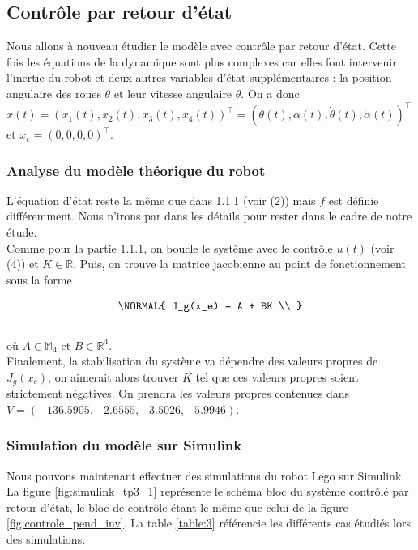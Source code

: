 \documentclass[11pt,french]{article} %
\begin{document}
\subsection{Contrôle par retour d'état}

\quad Nous allons à nouveau étudier le modèle avec contrôle par retour d'état. Cette fois les équations de la dynamique sont plus complexes car elles font intervenir l'inertie du robot et deux autres variables d'état supplémentaires : la position angulaire des roues $\theta$ et leur vitesse angulaire $\dot\theta$. On a donc $x(t) = (x_1(t),x_2(t),x_3(t),x_4(t))^\intercal = (\theta(t),\alpha(t),\dot\theta(t),\dot\alpha(t))^\intercal$ et $x_e = (0,0,0,0)^\intercal$. \\

\subsubsection{Analyse du modèle théorique du robot}

\quad L'équation d'état reste la même que dans 1.1.1 (voir (2)) mais $f$ est définie différemment. Nous n'irons par dans les détails pour rester dans le cadre de notre étude.\\
Comme pour la partie 1.1.1, on boucle le système avec le contrôle $u(t)$ (voir (4)) et $K \in \mathbb{R}$. Puis, on trouve la matrice jacobienne au point de fonctionnement sous la forme

\begin{equation}
	\NORMAL{
			J_g(x_e) = A + BK \\
	}
\end{equation}\\

où $A \in \mathbb{M}_4$ et $B \in \mathbb{R}^4$. \\

\quad Finalement, la stabilisation du système va dépendre des valeurs propres de $J_g(x_e)$, on aimerait alors trouver $K$ tel que ces valeurs propres soient strictement négatives. On prendra les valeurs propres contenues dans $V = (-136.5905, -2.6555, -3.5026, -5.9946)$. \\

\subsubsection{Simulation du modèle sur Simulink}

\quad Nous pouvons maintenant effectuer des simulations du robot Lego sur Simulink. La figure \ref{fig:simulink_tp3_1} représente le schéma bloc du système contrôlé par retour d'état, le bloc de contrôle étant le même que celui de la figure \ref{fig:controle_pend_inv}. La table \ref{table:3} référencie les différents cas étudiés lors des simulations. \\
\end{document}

